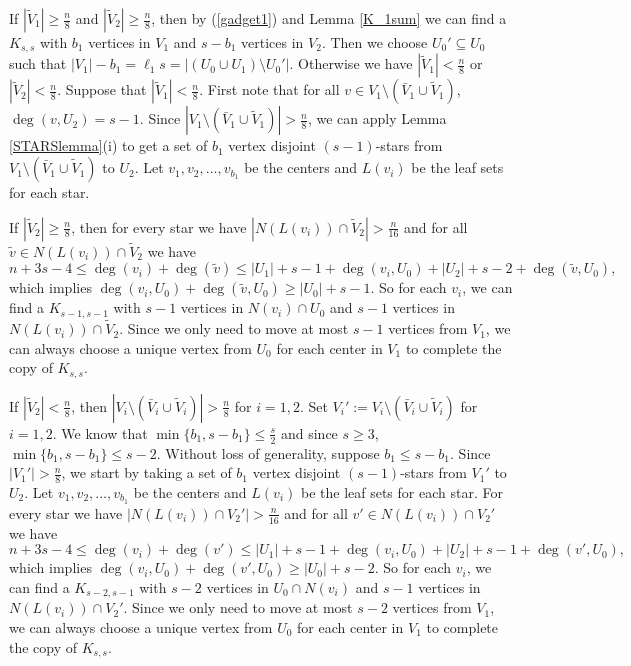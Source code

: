 \documentclass[oneside,12pt]{memoir}
\begin{document}
 
If $|\tilde{V}_1|\geq \frac{n}{8}$ and $|\tilde{V}_2|\geq \frac{n}{8}$, then by (\ref{gadget1}) and Lemma \ref{K_1sum} we can find a $K_{s,s}$ with $b_1$ vertices in $V_1$ and $s-b_1$ vertices in $V_2$.  Then we choose $U_0'\subseteq U_0$ such that $|V_1|-b_1=\ell_1s=|(U_0\cup U_1)\setminus U_0'|$.  Otherwise we have $|\tilde{V}_1|<\frac{n}{8}$ or $|\tilde{V}_2|<\frac{n}{8}$.  Suppose that $|\tilde{V}_1|<\frac{n}{8}$.  First note that for all $v\in V_1\setminus (\bar{V}_1\cup \tilde{V}_1)$, $\deg(v, U_2)=s-1$.  Since $|V_1\setminus (\bar{V}_1\cup \tilde{V}_1)|>\frac{n}{8}$, we can apply Lemma \ref{STARSlemma}(i) to get a set of $b_1$ vertex disjoint $(s-1)$-stars from $V_1\setminus (\bar{V}_1\cup \tilde{V}_1)$ to $U_2$.  Let $v_1, v_2,\dots, v_{b_1}$ be the centers and $L(v_i)$ be the leaf sets for each star.  

If $|\tilde{V}_2|\geq \frac{n}{8}$, then for every star we have $|N(L(v_i))\cap \tilde{V}_2|>\frac{n}{16}$ and for all $\tilde{v}\in N(L(v_i))\cap \tilde{V}_2$ we have $$n+3s-4\leq \deg(v_i)+\deg(\tilde{v})\leq |U_1|+s-1+\deg(v_i, U_0)+|U_2|+s-2+\deg(\tilde{v}, U_0),$$ which implies $\deg(v_i, U_0)+\deg(\tilde{v}, U_0)\geq |U_0|+s-1$.  So for each $v_i$, we can find a $K_{s-1,s-1}$ with $s-1$ vertices in $N(v_i)\cap U_0$ and $s-1$ vertices in $N(L(v_i))\cap \tilde{V}_2$.  Since we only need to move at most $s-1$ vertices from $V_1$, we can always choose a unique vertex from $U_0$ for each center in $V_1$ to complete the copy of $K_{s,s}$.  

If $|\tilde{V}_2|< \frac{n}{8}$, then  $|V_i\setminus (\bar{V}_i\cup \tilde{V}_i)|>\frac{n}{8}$ for $i=1,2$.  Set $V_i':=V_i\setminus (\bar{V}_i\cup \tilde{V}_i)$ for $i=1,2$.  We know that $\min\{b_1, s-b_1\}\leq \frac{s}{2}$ and since $s\geq 3$,  $\min\{b_1, s-b_1\}\leq s-2$.  Without loss of generality, suppose $b_1\leq s-b_1$.  Since $|V_1'|>\frac{n}{8}$, we start by taking a set of $b_1$ vertex disjoint $(s-1)$-stars from $V_1'$ to $U_2$.  Let $v_1, v_2,\dots, v_{b_1}$ be the centers and $L(v_i)$ be the leaf sets for each star.  For every star we have $|N(L(v_i))\cap V_2'|>\frac{n}{16}$ and for all $v'\in N(L(v_i))\cap V_2'$ we have $$n+3s-4\leq \deg(v_i)+\deg(v')\leq |U_1|+s-1+\deg(v_i, U_0)+|U_2|+s-1+\deg(v', U_0),$$ which implies $\deg(v_i, U_0)+\deg(v', U_0)\geq |U_0|+s-2$. So for each $v_i$, we can find a $K_{s-2,s-1}$ with $s-2$ vertices in $U_0\cap N(v_i)$ and $s-1$ vertices in $N(L(v_i))\cap V_2'$.  Since we only need to move at most $s-2$ vertices from $V_1$, we can always choose a unique vertex from $U_0$ for each center in $V_1$ to complete the copy of $K_{s,s}$.  
\end{document}
